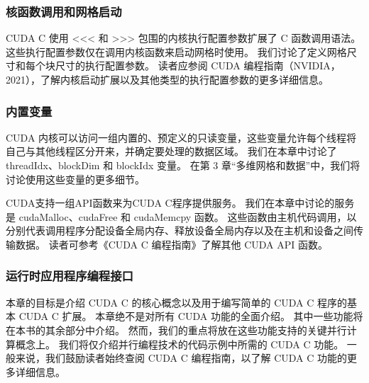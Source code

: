 \subsubsection{核函数调用和网格启动}
CUDA C 使用 <<< 和 >>> 包围的内核执行配置参数扩展了 C 函数调用语法。这些执行配置参数仅在调用内核函数来启动网格时使用。 我们讨论了定义网格尺寸和每个块尺寸的执行配置参数。 读者应参阅 CUDA 编程指南（NVIDIA，2021），了解内核启动扩展以及其他类型的执行配置参数的更多详细信息。


\subsubsection{内置变量}
CUDA 内核可以访问一组内置的、预定义的只读变量，这些变量允许每个线程将自己与其他线程区分开来，并确定要处理的数据区域。 我们在本章中讨论了 threadIdx、blockDim 和 blockIdx 变量。 在第 3 章“多维网格和数据”中，我们将讨论使用这些变量的更多细节。

CUDA支持一组API函数来为CUDA C程序提供服务。 我们在本章中讨论的服务是 cudaMalloc、cudaFree 和 cudaMemcpy 函数。 这些函数由主机代码调用，以分别代表调用程序分配设备全局内存、释放设备全局内存以及在主机和设备之间传输数据。 读者可参考《CUDA C 编程指南》了解其他 CUDA API 函数。


\subsubsection{运行时应用程序编程接口}
本章的目标是介绍 CUDA C 的核心概念以及用于编写简单的 CUDA C 程序的基本 CUDA C 扩展。 本章绝不是对所有 CUDA 功能的全面介绍。 其中一些功能将在本书的其余部分中介绍。 然而，我们的重点将放在这些功能支持的关键并行计算概念上。 我们将仅介绍并行编程技术的代码示例中所需的 CUDA C 功能。 一般来说，我们鼓励读者始终查阅 CUDA C 编程指南，以了解 CUDA C 功能的更多详细信息。


